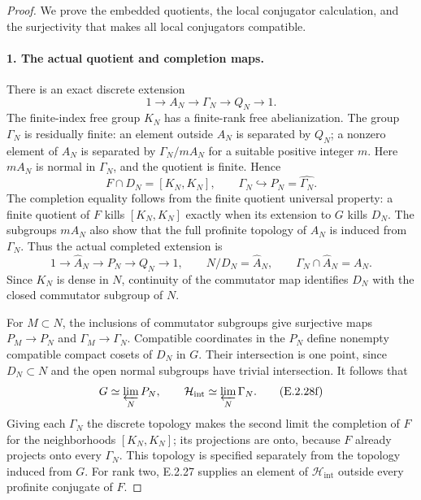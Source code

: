 \begin{proof}
We prove the embedded quotients, the local conjugator calculation,
and the surjectivity that makes all local conjugators compatible.

\paragraph{1. The actual quotient and completion maps.}
There is an exact discrete extension
\[
 1\longrightarrow A_N\longrightarrow\Gamma_N
   \longrightarrow Q_N\longrightarrow1.
 \tag{E.2.28c}
\]
The finite-index free group \(K_N\) has a finite-rank free
abelianization. The group \(\Gamma_N\) is residually finite:
an element outside \(A_N\) is separated by \(Q_N\); a nonzero
element of \(A_N\) is separated by
\(\Gamma_N/mA_N\) for a suitable positive integer \(m\).
Here \(mA_N\) is normal in \(\Gamma_N\), and the quotient
is finite. Hence
\[
 F\cap D_N=[K_N,K_N],\qquad
 \Gamma_N\hookrightarrow P_N=\widehat{\Gamma_N}.
 \tag{E.2.28d}
\]
The completion equality follows from the finite quotient
universal property: a finite quotient of \(F\) kills
\([K_N,K_N]\) exactly when its extension to \(G\) kills
\(D_N\). The subgroups \(mA_N\) also show that the full
profinite topology of \(A_N\) is induced from \(\Gamma_N\).
Thus the actual completed extension is
\[
 1\longrightarrow\widehat A_N\longrightarrow P_N
       \longrightarrow Q_N\longrightarrow1,
 \qquad N/D_N=\widehat A_N,\qquad
 \Gamma_N\cap\widehat A_N=A_N.
 \tag{E.2.28e}
\]
Since \(K_N\) is dense in \(N\), continuity of the commutator
map identifies \(D_N\) with the closed commutator subgroup
of \(N\).

For \(M\subset N\), the inclusions of commutator subgroups
give surjective maps \(P_M\to P_N\) and
\(\Gamma_M\to\Gamma_N\). Compatible coordinates in the
\(P_N\) define nonempty compatible compact cosets of \(D_N\)
in \(G\). Their intersection is one point, since
\(D_N\subset N\) and the open normal subgroups have trivial
intersection. It follows that
\[
 G\simeq\varprojlim_NP_N,\qquad
 \mathcal H_{\mathrm{int}}\simeq\varprojlim_N\Gamma_N.
 \tag{E.2.28f}
\]
Giving each \(\Gamma_N\) the discrete topology makes the
second limit the completion of \(F\) for the neighborhoods
\([K_N,K_N]\); its projections are onto, because \(F\)
already projects onto every \(\Gamma_N\). This topology
is specified separately from the topology induced from \(G\).
For rank two, E.2.27 supplies an element of
\(\mathcal H_{\mathrm{int}}\) outside every profinite
conjugate of \(F\).


\end{proof}
